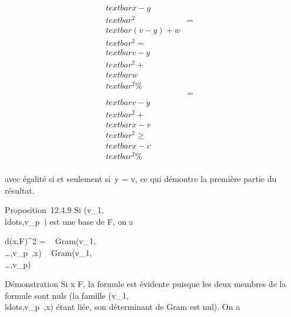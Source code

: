 \documentclass[]{article}
\begin{document}
\begin{align*} \\textbar{}x -
y\\textbar{}^2& =&
\\textbar{}(v - y) +
w\\textbar{}^2 =\\textbar{} v -
y\\textbar{}^2 +\\textbar{}
w\\textbar{}^2\%&
\\ & =& \\textbar{}v -
y\\textbar{}^2 +\\textbar{} x -
v\\textbar{}^2 ≥\\textbar{} x -
v\\textbar{}^2 \%&
\\ \end{align*}

avec égalité si et seulement si~y = v, ce qui démontre la première
partie du résultat.

Proposition~12.4.9 Si
(v\_1,\\ldots,v\_p~)
est une base de F, on a

d(x,F)^2 =
~
Gram(v\_1,\\\ldots,v\_p~,x)
\over
{}~
Gram(v\_1,\\\ldots,v\_p)~

Démonstration Si x \in F, la formule est évidente puisque les deux membres
de la formule sont nuls (la famille
(v\_1,\\ldots,v\_p~,x)
étant liée, son déterminant de Gram est nul). On a
\end{document}
